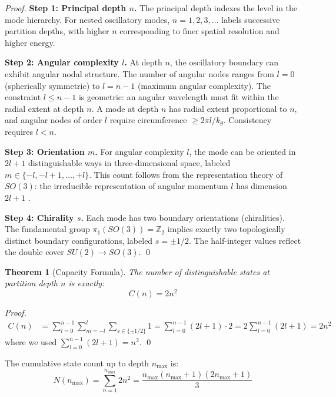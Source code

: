 \documentclass[twocolumn,10pt,a4paper]{article}
\newtheorem{theorem}{Theorem}[section]
\theoremstyle{definition}
\theoremstyle{remark}
\begin{document}
\begin{proof}
\textbf{Step 1: Principal depth $n$.}
The principal depth indexes the level in the mode hierarchy. For nested oscillatory modes, $n = 1, 2, 3, \ldots$ labels successive partition depths, with higher $n$ corresponding to finer spatial resolution and higher energy.

\textbf{Step 2: Angular complexity $l$.}
At depth $n$, the oscillatory boundary can exhibit angular nodal structure. The number of angular nodes ranges from $l = 0$ (spherically symmetric) to $l = n-1$ (maximum angular complexity). The constraint $l \leq n-1$ is geometric: an angular wavelength must fit within the radial extent at depth $n$. A mode at depth $n$ has radial extent proportional to $n$, and angular nodes of order $l$ require circumference $\geq 2\pi l/k_\theta$. Consistency requires $l < n$.

\textbf{Step 3: Orientation $m$.}
For angular complexity $l$, the mode can be oriented in $2l + 1$ distinguishable ways in three-dimensional space, labeled $m \in \{-l, -l+1, \ldots, +l\}$. This count follows from the representation theory of $SO(3)$: the irreducible representation of angular momentum $l$ has dimension $2l + 1$ \citep{hall2015,hamermesh1962}.

\textbf{Step 4: Chirality $s$.}
Each mode has two boundary orientations (chiralities). The fundamental group $\pi_1(SO(3)) = \mathbb{Z}_2$ implies exactly two topologically distinct boundary configurations, labeled $s = \pm 1/2$. The half-integer values reflect the double cover $SU(2) \to SO(3)$. \qed
\end{proof}

\begin{theorem}[Capacity Formula]
\label{thm:capacity}
The number of distinguishable states at partition depth $n$ is exactly:
\begin{equation}
    C(n) = 2n^2
    \label{eq:capacity}
\end{equation}
\end{theorem}

\begin{proof}
\begin{align}
    C(n) &= \sum_{l=0}^{n-1} \sum_{m=-l}^{l} \sum_{s \in \{\pm 1/2\}} 1 = \sum_{l=0}^{n-1} (2l+1) \cdot 2 = 2\sum_{l=0}^{n-1} (2l+1) = 2n^2
\end{align}
where we used $\sum_{l=0}^{n-1}(2l+1) = n^2$. \qed
\end{proof}

The cumulative state count up to depth $n_{\max}$ is:
\begin{equation}
    N(n_{\max}) = \sum_{n=1}^{n_{\max}} 2n^2 = \frac{n_{\max}(n_{\max}+1)(2n_{\max}+1)}{3}
    \label{eq:cumulative}
\end{equation}
\end{document}
